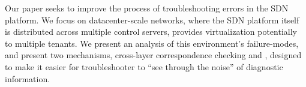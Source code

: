 Our paper seeks to improve the process of troubleshooting errors in the SDN
platform. We focus on datacenter-scale networks, 
where the SDN platform itself is distributed across multiple control servers,
provides virtualization potentially to multiple tenants. We present an
analysis of this environment's failure-modes, and present two mechanisms, cross-layer correspondence checking
and \simulator, 
designed to make it easier for troubleshooter to ``see through the noise'' of
diagnostic information. 
